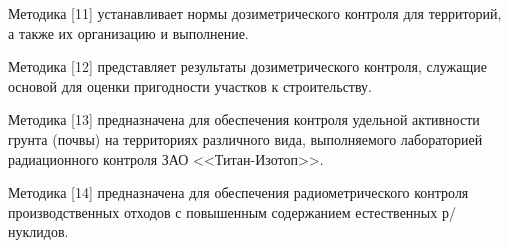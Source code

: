 	Методика [11] устанавливает нормы дозиметрического контроля для 
    территорий, а также их организацию и выполнение.

	Методика [12] представляет результаты дозиметрического контроля, 
    служащие основой для оценки пригодности участков к строительству.

	Методика [13] предназначена для обеспечения контроля удельной 
    активности грунта (почвы) на территориях различного вида, выполняемого 
    лабораторией радиационного контроля ЗАО <<Титан-Изотоп>>.
	
	Методика [14] предназначена для обеспечения радиометрического контроля 
    производственных отходов с повышенным содержанием естественных 
    р/нуклидов.

\clearpage
